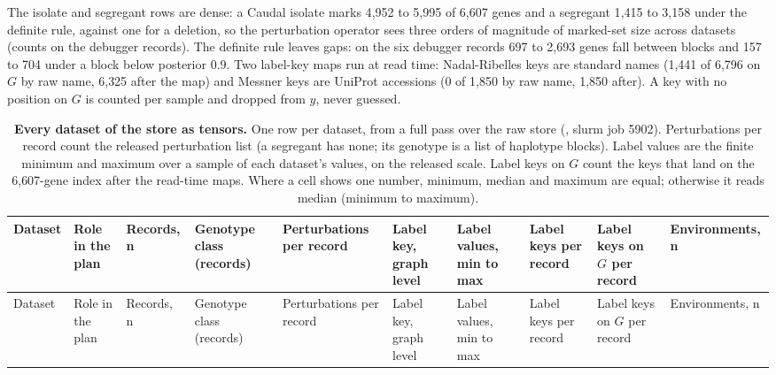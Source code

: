 The isolate and segregant rows are dense: a Caudal isolate marks 4{,}952 to 5{,}995 of
6{,}607 genes and a segregant 1{,}415 to 3{,}158 under the definite rule, against one
for a deletion, so the perturbation operator sees three orders of magnitude of marked-set
size across datasets (counts on the debugger records). The definite rule leaves gaps: on
the six debugger records 697 to 2{,}693 genes fall between blocks and 157 to 704 under a
block below posterior 0.9. Two label-key maps run at read time: Nadal-Ribelles keys are
standard names (1{,}441 of 6{,}796 on $G$ by raw name, 6{,}325 after the map) and Messner
keys are UniProt accessions (0 of 1{,}850 by raw name, 1{,}850 after). A key with no
position on $G$ is counted per sample and dropped from $y$, never guessed.

\begin{landscape}
\scriptsize
\setlength{\tabcolsep}{3pt}
\begin{longtable}{>{\raggedright\arraybackslash}p{24mm}>{\raggedright\arraybackslash}p{24mm}>{\raggedleft\arraybackslash}p{12mm}>{\raggedright\arraybackslash}p{24mm}>{\raggedleft\arraybackslash}p{20mm}>{\raggedright\arraybackslash}p{31mm}>{\raggedleft\arraybackslash}p{19mm}>{\raggedleft\arraybackslash}p{23mm}>{\raggedleft\arraybackslash}p{23mm}>{\raggedleft\arraybackslash}p{18mm}}
\caption[]{\textbf{Every dataset of the store as tensors.} One row per dataset, from a
full pass over the raw store (, slurm job 5902). Perturbations
per record count the released perturbation list (a segregant has none; its genotype is a
list of haplotype blocks). Label values are the finite minimum and maximum over a sample
of each dataset's values, on the released scale. Label keys on $G$ count the keys that
land on the 6{,}607-gene index after the read-time maps. Where a cell shows one number,
minimum, median and maximum are equal; otherwise it reads median (minimum to
maximum).}\label{tab:shapes}\\
\toprule
Dataset & Role in the plan & Records, n & Genotype class (records) & Perturbations per record & Label key, graph level & Label values, min to max & Label keys per record & Label keys on $G$ per record & Environments, n \\
\midrule
\endfirsthead
\toprule
Dataset & Role in the plan & Records, n & Genotype class (records) & Perturbations per record & Label key, graph level & Label values, min to max & Label keys per record & Label keys on $G$ per record & Environments, n \\
\midrule
\endhead

\end{longtable}
\end{landscape}
